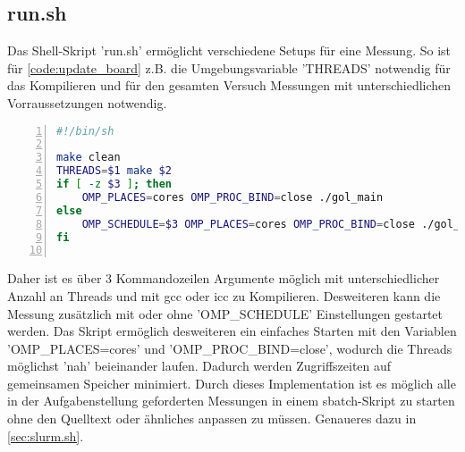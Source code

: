 \documentclass[plainarticle,zihtitle,german,final,hyperref,utf8]{zihpub}
\begin{document}
\subsection{run.sh}\label{sec:run.sh}
Das Shell-Skript 'run.sh' ermöglicht verschiedene Setups für eine Messung. So ist für \ref{code:update_board} z.B. die Umgebungsvariable 'THREADS' notwendig für das Kompilieren und für den gesamten Versuch Messungen mit unterschiedlichen Vorraussetzungen notwendig.
\begin{lstlisting}[language=bash, numbers=left]
#!/bin/sh

make clean
THREADS=$1 make $2
if [ -z $3 ]; then
	OMP_PLACES=cores OMP_PROC_BIND=close ./gol_main
else
	OMP_SCHEDULE=$3 OMP_PLACES=cores OMP_PROC_BIND=close ./gol_main $3
fi
	
\end{lstlisting}
Daher ist es über 3 Kommandozeilen Argumente möglich mit unterschiedlicher Anzahl an Threads und mit gcc oder icc zu Kompilieren. Desweiteren kann die Messung zusätzlich mit oder ohne 'OMP\_SCHEDULE' Einstellungen gestartet werden.
Das Skript ermöglich desweiteren ein einfaches Starten mit den Variablen 'OMP\_PLACES=cores' und 'OMP\_PROC\_BIND=close', wodurch die Threads möglichst 'nah' beieinander laufen. Dadurch werden Zugriffszeiten auf gemeinsamen Speicher minimiert.\newline
Durch dieses Implementation ist es möglich alle in der Aufgabenstellung geforderten Messungen in einem sbatch-Skript zu starten ohne den Quelltext oder ähnliches anpassen zu müssen. Genaueres dazu in \ref{sec:slurm.sh}.
\end{document}
